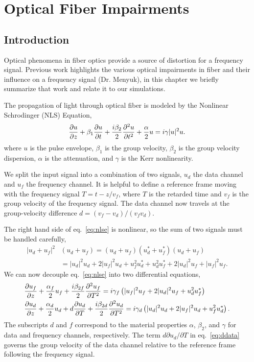 
\chapter{Optical Fiber Impairments}
\label{chap:fiber_impairments}


\section{Introduction}

Optical phenomena in fiber optics provide a source of distortion for a frequency signal. Previous work highlights the various optical impairments in fiber and their influence on a frequency signal (Dr. Menyuk), in this chapter we briefly summarize that work and relate it to our simulations.

The propagation of light through optical fiber is modeled by the Nonlinear Schrodinger (NLS) Equation,
%
\begin{equation} \label{eq:nlse}
\frac{\partial u}{\partial z} + \beta_1\frac{\partial u}{\partial t} + \frac{i\beta_2}{2}\frac{\partial ^2u}{\partial t^2} + \frac{\alpha}{2}u = i\gamma|u|^2u.
\end{equation}
where $u$ is the pulse envelope, $\beta_1$ is the group velocity, $\beta_2$ is the group velocity dispersion, $\alpha$ is the attenuation, and $\gamma$ is the Kerr nonlinearity. 

We split the input signal into a combination of two signals, $u_d$ the data channel and $u_f$ the frequency channel. It is helpful to define a reference frame moving with the frequency signal $T = t - z/v_f$, where $T$ is the retarded time and $v_f$ is the group velocity of the frequency signal. The data channel now travels at the group-velocity difference $d = (v_f - v_d)/(v_fv_d)$.

The right hand side of eq.~\ref{eq:nlse} is nonlinear, so the sum of two signals must be handled carefully,
%
\begin{align}
\nonumber
|u_d + u_f|^2&(u_d + u_f) = (u_d + u_f)(u_d^* + u_f^*)(u_d + u_f) \\
&= |u_d|^2u_d + 2|u_f|^2u_d + u_f^2u_d^* + u_d^2u_f^* + 2|u_d|^2u_f + |u_f|^2u_f.
\end{align}
%
We can now decouple eq.~\ref{eq:nlse} into two differential equations,
%
\begin{align}
\label{eq:dfreq}
&\frac{\partial u_f}{\partial z} + \frac{\alpha_f}{2}u_f + \frac{i\beta_{2f}}{2}\frac{\partial ^2u_f}{\partial T^2} = i\gamma_f\left( |u_f|^2u_f + 2|u_d|^2u_f + u_d^2u_f^* \right) \\
\label{eq:ddata}
&\frac{\partial u_d}{\partial z} + \frac{\alpha_d}{2}u_d + d\frac{\partial u_d}{\partial T} + \frac{i\beta_{2d}}{2}\frac{\partial ^2u_d}{\partial T^2} = i\gamma_d\left( |u_d|^2u_d + 2|u_f|^2u_d + u_f^2u_d^* \right).
\end{align}
%
The subscripts $d$ and $f$ correspond to the material properties $\alpha$, $\beta_2$, and $\gamma$ for data and frequency channels, respectively. The term $d\partial u_d/\partial T$ in eq.~\ref{eq:ddata} governs the group velocity of the data channel relative to the reference frame following the frequency signal.

